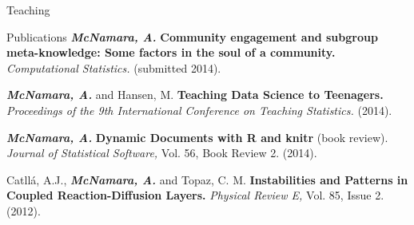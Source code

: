 \documentclass{resume} %
\begin{document}
\begin{rSection}{Teaching}
\end{rSection}



\begin{rSection}{Publications}
{\bf \em McNamara, A.} {\bf Community engagement and subgroup meta-knowledge: Some factors in the soul of a community.} { \em Computational Statistics.} (submitted 2014).

{\bf \em McNamara, A. }and Hansen, M. {\bf Teaching Data Science to Teenagers.}{ \em Proceedings of the 9th International Conference on Teaching Statistics.} (2014). 

{\bf \em McNamara, A. }{\bf Dynamic Documents with R and knitr} (book review). {\em Journal of Statistical Software,}{ Vol. 56, Book Review 2.} (2014).

{Catll{\'a}, A.J., {\bf \em McNamara, A.} and Topaz, C. M.} {\bf Instabilities and Patterns in Coupled Reaction-Diffusion Layers.} {\em Physical Review E,} Vol. 85, Issue 2. (2012). 

\end{rSection}

\end{document}
